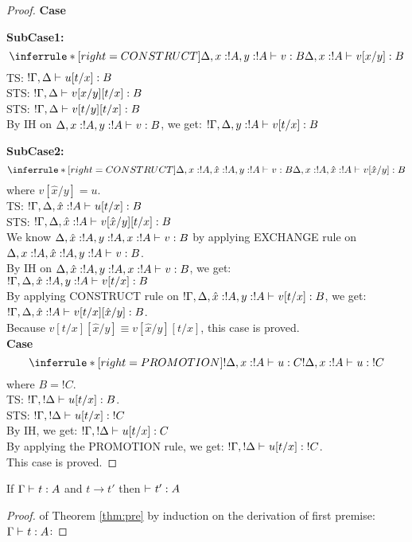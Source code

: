 \documentclass[titlepage]{article}
\begin{document}
\begin{proof}
  \noindent \textbf{Case}

  \noindent \textbf{SubCase1:}
  \[
   \inferrule*[ right = CONSTRUCT ]
   {\Delta, x:!A, y:!A \jtype{}{}{v}{B}}
   { \Delta, x:!A \jtype{}{}{v[x/y]}{B}}
  \]  
  TS: $! \Gamma, \Delta \mathrel{\vdash_{}^{} {u[t/x]} : {B}}$ \\
  STS: $! \Gamma, \Delta \mathrel{\vdash_{}^{} {v[x/y][t/x]} : {B}}$ \\
  STS: $! \Gamma, \Delta \mathrel{\vdash_{}^{} {v[t/y][t/x]} : {B}}$ \\
  By IH on $\Delta, x:!A, y:!A \mathrel{\vdash_{}^{} {v} : {B}}$, we get:
  $! \Gamma, \Delta, y:!A \mathrel{\vdash_{}^{} {v[t/x]} : {B}} $

  \noindent \textbf{SubCase2:}
  \[
   \inferrule*[ right = CONSTRUCT ]
   {\Delta, x:!A, \hat{x}:!A, y:!A \jtype{}{}{v}{B}}
   { \Delta, x:!A, \hat{x}:!A  \jtype{}{}{v[\hat{x}/y]}{B}}
  \]  
  where $v[\hat{x}/y] = u$.\\
  TS: $! \Gamma, \Delta, \hat{x}:!A \mathrel{\vdash_{}^{} {u[t/x]} : {B}}$ \\
  STS: $! \Gamma, \Delta, \hat{x}:!A \mathrel{\vdash_{}^{} {v[\hat{x}/y][t/x]} : {B}}$ \\
  We know $\Delta, \hat{x}:!A, y:!A, x:!A \mathrel{\vdash_{}^{} {v} : {B}}$ by applying EXCHANGE rule on $\Delta, x:!A, \hat{x}:!A, y:!A \mathrel{\vdash_{}^{} {v} : {B}}$.\\
  By IH on $\Delta, \hat{x}:!A, y:!A, x:!A \mathrel{\vdash_{}^{} {v} : {B}}$, we get:\\
  $!\Gamma, \Delta, \hat{x}:!A, y:!A \mathrel{\vdash_{}^{} {v[t/x]} : {B}} $\\
  By applying CONSTRUCT rule on $!\Gamma, \Delta, \hat{x}:!A, y:!A \mathrel{\vdash_{}^{} {v[t/x]} : {B}} $, we get:\\
  $! \Gamma, \Delta, \hat{x}:!A \mathrel{\vdash_{}^{} {v[t/x][\hat{x}/y]} : {B}}$.\\
  Because $v[t/x][\hat{x}/y] \equiv v[\hat{x}/y][t/x]$, this case is proved.\\


  \noindent \textbf{Case}
  \[
   \inferrule*[ right = PROMOTION ]
   {!\Delta, x:!A \jtype{}{}{u}{C}}
   { ! \Delta, x:!A  \jtype{}{}{u}{!C}  }
  \]
  where $B = !C$.\\
  TS: $! \Gamma, ! \Delta \mathrel{\vdash_{}^{} {u[t/x]} : {B}}$.\\
  STS: $! \Gamma, ! \Delta \mathrel{\vdash_{}^{} {u[t/x]} : {!C}}$\\
  By IH, we get: $! \Gamma, ! \Delta \mathrel{\vdash_{}^{} {u[t/x]} : {C}}$\\
  By applying the PROMOTION rule, we get: $! \Gamma, ! \Delta \mathrel{\vdash_{}^{} {u[t/x]} : {!C}}$.\\
  This case is proved.
\end{proof}


\begin{theorem}[Preservation]
\label{thm:pre}
  If $\Gamma \mathrel{\vdash_{}^{} {t} : {A}}$ and $t \rightarrow t' $ then $ \mathrel{\vdash_{}^{} {t'} : {A}} $
\end{theorem}
\begin{proof} of Theorem \ref{thm:pre} by induction on the derivation  of first premise: $\Gamma \mathrel{\vdash_{}^{} {t} : {A}}$:


\end{proof}
\end{document}
